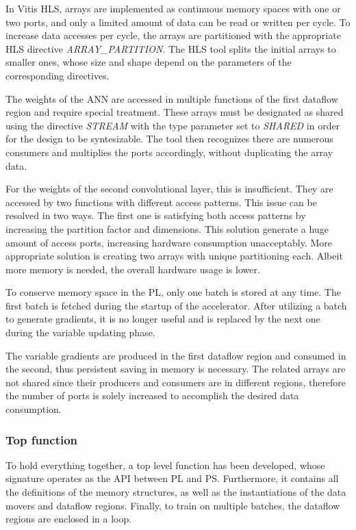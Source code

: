 In Vitis HLS, arrays are implemented as continuous memory spaces with one or two ports, and only a limited amount of data can be read or written per cycle. To increase data accesses per cycle, the arrays are partitioned with the appropriate HLS directive \emph{ARRAY\_PARTITION}. The HLS tool splits the initial arrays to smaller ones, whose size and shape depend on the parameters of the corresponding directives. %

The weights of the ANN are accessed in multiple functions of the first dataflow region and require special treatment. These arrays must be designated as shared using the directive \emph{STREAM} with the type parameter set to \emph{SHARED} in order for the design to be syntesizable. The tool then recognizes there are numerous consumers and multiplies the ports accordingly, without duplicating the array data. %

For the weights of the second convolutional layer, this is insufficient. They are accessed by two functions with different access patterns. This issue can be resolved in two ways. The first one is satisfying both access patterns by increasing the partition factor and dimensions. This solution generate a huge amount of access ports, increasing hardware consumption unacceptably. More appropriate solution is creating two arrays with unique partitioning each. Albeit more memory is needed, the overall hardware usage is lower. %

To conserve memory space in the PL, only one batch is stored at any time. The first batch is fetched during the startup of the accelerator. After utilizing a batch to generate gradients, it is no longer useful and is replaced by the next one during the variable updating phase. %

The variable gradients are produced in the first dataflow region and consumed in the second, thus persistent saving in memory is necessary. The related arrays are not shared since their producers and consumers are in different regions, therefore the number of ports is solely increased to accomplish the desired data consumption. %

\subsubsection{Top function}
To hold everything together, a top level function has been developed, whose signature operates as the API between PL and PS. Furthermore, it contains all the definitions of the memory structures, as well as the instantiations of the data movers and dataflow regions. Finally, to train on multiple batches, the dataflow regions are enclosed in a loop.


